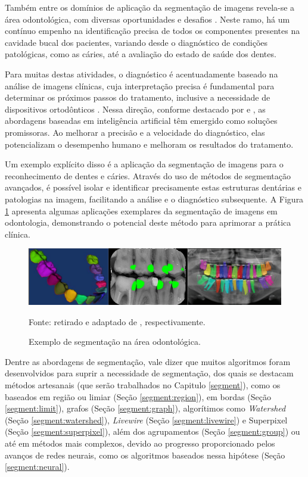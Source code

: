 Também entre os domínios de aplicação da segmentação de imagens revela-se a área odontológica, com diversas oportunidades e desafios \citep{Ghazvinian2021,Minyoung2020}. Neste ramo, há um contínuo empenho na identificação precisa de todos os componentes presentes na cavidade bucal dos pacientes, variando desde o diagnóstico de condições patológicas, como as cáries, até a avaliação do estado de saúde dos dentes.

Para muitas destas atividades, o diagnóstico é acentuadamente baseado na análise de imagens clínicas, cuja interpretação precisa é fundamental para determinar os próximos passos do tratamento, inclusive a necessidade de dispositivos ortodônticos \citep{Schwendicke2020}. Nessa direção, conforme destacado por \cite{Bansal2021, Nguyen2021} e \cite{Schwendicke2020}, as abordagens baseadas em inteligência artificial têm emergido como soluções promissoras. Ao melhorar a precisão e a velocidade do diagnóstico, elas potencializam o desempenho humano e melhoram os resultados do tratamento.

Um exemplo explícito disso é a aplicação da segmentação de imagens para o reconhecimento de dentes e cáries. Através do uso de métodos de segmentação avançados, é possível isolar e identificar precisamente estas estruturas dentárias e patologias na imagem, facilitando a análise e o diagnóstico subsequente. A Figura \ref{intro:fig:4} apresenta algumas aplicações exemplares da segmentação de imagens em odontologia, demonstrando o potencial deste método para aprimorar a prática clínica.

\begin{figure}[H]
    \centering
    \caption{Exemplo de segmentação na área odontológica.}
    \includegraphics[width=1\linewidth]{recursos/imagens/introduction/odonto_segmentation.png}
    \label{intro:fig:4}

    Fonte: retirado e adaptado de \cite{Shuai2016,Bayrakdar2021,Gil2019}, respectivamente.
\end{figure}

Dentre as abordagens de segmentação, vale dizer que muitos algoritmos foram desenvolvidos para suprir a necessidade de segmentação, dos quais se destacam métodos artesanais (que serão trabalhados no Capitulo \ref{segment}), como os baseados em região ou limiar (Seção \ref{segment:region}), em bordas (Seção \ref{segment:limit}), grafos (Seção \ref{segment:graph}), algorítimos como \textit{Watershed} (Seção \ref{segment:watershed}), \textit{Livewire} (Seção \ref{segment:livewire}) e Superpixel (Seção \ref{segment:superpixel}), além dos agrupamentos (Seção \ref{segment:group}) ou até em métodos mais complexos, devido ao progresso proporcionado pelos avanços de redes neurais, como os algoritmos baseados nessa hipótese (Seção \ref{segment:neural}).

